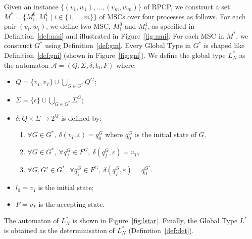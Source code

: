 \begin{definition}\label{def:lstar}
	Given an instance $\{(v_1, w_1), \ldots, (v_m, w_m)\}$ of RPCP, we
	construct a set $M^* = \{M_i^0, M_i^1 \mid i \in \{1, \ldots, m\}\}$ of
	MSCs over four processes as follows. For each pair $(v_i, w_i)$,
	we define two MSC, $M_i^0$ and $M_i^1$, as specified in
	Definition~\ref{def:mni} and illustrated in Figure~\ref{fig:mni}.
	For each MSC in $M^*$, we construct $G^*$ using Definition~\ref{def:gm}.
	Every Global Type in $G^*$ is shaped like Definition~\ref{def:gni} 
	(shown in Figure~\ref{fig:gni}).
	We define the global type $L^*_{N}$ as the automaton
	$\mathcal A = (Q,\Sigma, \delta, l_0, F)$ where:
	\begin{itemize}
		\item $Q = \{v_I,v_T\}\cup \bigcup_{G\in G^*} Q^G$;
		\item $\Sigma = \{\epsilon\}\cup\bigcup_{G\in G^*} \Sigma^G$;
		\item $\delta: Q \times \Sigma \rightarrow 2^Q$ is defined by:
			      \begin{enumerate}
				       \item $\forall G \in G^*,\ \delta(v_I, \varepsilon) = q_0^G$ where $q_0^G$ is the initial state of $G$,
				       \item $\forall G \in G^*,\ \forall q_f^G \in F^G,\ \delta(q_f^G, \varepsilon) = v_T$,
				       \item $\forall G, G' \in G^*,\ \forall q_f^G \in F^G,\ \delta(q_f^G, \varepsilon) = q_0^{G'}$.
			      \end{enumerate}
		\item $l_0 = v_I$ is the initial state;
		\item $F = v_T$ is the accepting state.
	\end{itemize}
	The automaton of $L^*_{N}$ is shown in Figure~\ref{fig:lstar}.  
	Finally, the Global Type $L^*$ is obtained as the determinisation 
	of $L^*_{N}$ (Definition~\ref{def:det}).
\end{definition}

